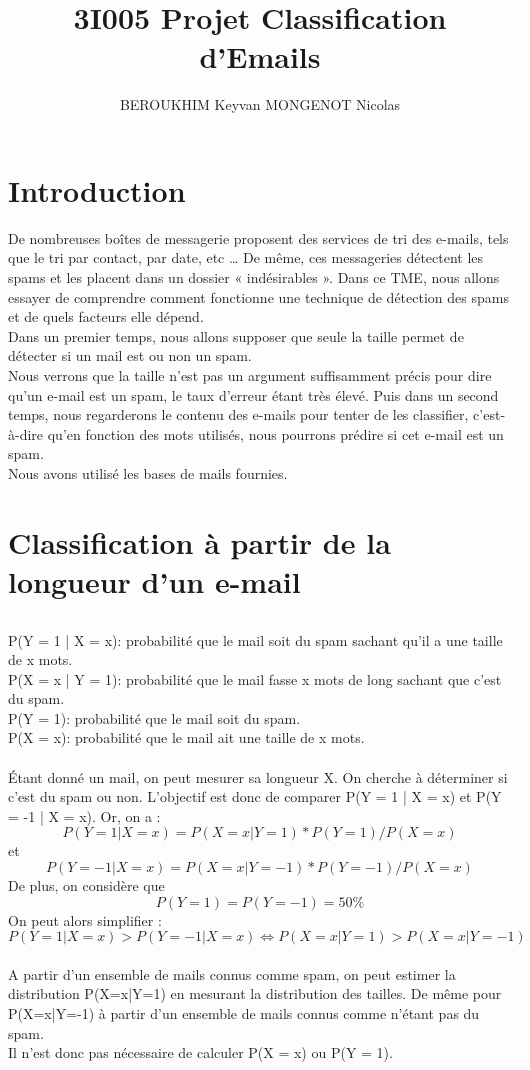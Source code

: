 \documentclass[a4paper]{article}
\title{3I005 Projet Classification d'Emails}
\author{BEROUKHIM Keyvan MONGENOT Nicolas}
\date{}
\begin{document}
\maketitle

\section{Introduction}
De nombreuses boîtes de messagerie proposent des services de tri des e-mails, tels que le tri par contact, par date, etc … De même, ces messageries détectent les spams et les placent dans un dossier « indésirables ».
Dans ce TME, nous allons essayer de comprendre comment fonctionne une technique de détection des spams et de quels facteurs elle dépend. \\
Dans un premier temps, nous allons supposer que seule la taille permet de détecter si un mail est ou non un spam.\\
Nous verrons que la taille n’est pas un argument suffisamment précis pour dire qu’un e-mail est un spam, le taux d’erreur étant très élevé.
Puis dans un second temps, nous regarderons le contenu des e-mails pour tenter de les classifier, c’est-à-dire qu’en fonction des mots utilisés, nous pourrons prédire si cet e-mail est un spam.\\
Nous avons utilisé les bases de mails fournies.
\section{Classification à partir de la longueur d'un e-mail}
\subsection{} \label{partie2.1}

P(Y = 1 | X = x): probabilité que le mail soit du spam sachant qu'il a une taille de x mots.\\
P(X = x | Y = 1): probabilité que le mail fasse x mots de long sachant que c'est du spam.\\
P(Y = 1): probabilité que le mail soit du spam.\\
P(X = x): probabilité que le mail ait une taille de x mots.\\\\
Étant donné un mail, on peut mesurer sa longueur X. On cherche à déterminer si c'est du spam ou non. L'objectif est donc de comparer P(Y = 1 | X = x) et P(Y = -1 | X = x).
Or, on a :
$$P(Y = 1 | X = x) = P(X = x | Y = 1) * P(Y = 1) / P(X = x)$$ et
$$P(Y = -1 | X = x) = P(X = x | Y = -1) * P(Y = -1) / P(X = x)$$
De plus, on considère que
$$P(Y = 1) = P(Y = -1) = 50\%$$ 
On peut alors simplifier :
$$P(Y = 1 | X = x) > P(Y = -1 | X = x)	\Leftrightarrow P(X = x | Y = 1) > P(X = x | Y = -1)$$
\\
A partir d'un ensemble de mails connus comme spam, on peut estimer la distribution P(X=x|Y=1) en mesurant la distribution des tailles. De même pour P(X=x|Y=-1) à partir d'un  ensemble de mails connus comme n'étant pas du spam.\\
Il n'est donc pas nécessaire de calculer P(X = x) ou P(Y = 1).
\end{document}
